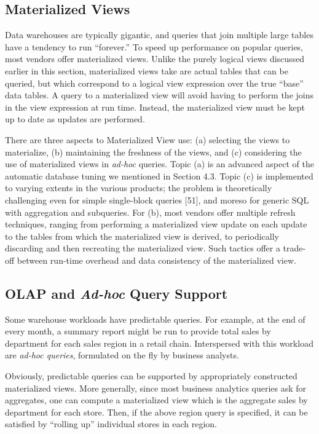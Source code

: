 \documentclass[b5paper,11pt,twoside,openright]{book}
\begin{document}
\hypertarget{materialized-views}{%
\subsection{Materialized Views}\label{materialized-views}}

Data warehouses are typically gigantic, and queries that join multiple
large tables have a tendency to run ``forever.'' To speed up performance
on popular queries, most vendors offer materialized views. Unlike the
purely logical views discussed earlier in this section, materialized
views take are actual tables that can be queried, but which correspond
to a logical view expression over the true ``base'' data tables. A query
to a materialized view will avoid having to perform the joins in the
view expression at run time. Instead, the materialized view must be kept
up to date as updates are performed.

There are three aspects to Materialized View use: (a) selecting the
views to materialize, (b) maintaining the freshness of the views, and
(c) considering the use of materialized views in \emph{ad-hoc} queries.
Topic (a) is an advanced aspect of the automatic database tuning we
mentioned in Section 4.3. Topic (c) is implemented to varying extents in
the various products; the problem is theoretically challenging even for
simple single-block queries {[}51{]}, and moreso for generic SQL with
aggregation and subqueries. For (b), most vendors offer multiple refresh
techniques, ranging from performing a materialized view update on each
update to the tables from which the materialized view is derived, to
periodically discarding and then recreating the materialized view. Such
tactics offer a trade-off between run-time overhead and data consistency
of the materialized view.

\hypertarget{olap-and-ad-hoc-query-support}{%
\subsection{\texorpdfstring{OLAP and \emph{Ad-hoc} Query
Support}{OLAP and Ad-hoc Query Support}}\label{olap-and-ad-hoc-query-support}}

Some warehouse workloads have predictable queries. For example, at the
end of every month, a summary report might be run to provide total sales
by department for each sales region in a retail chain. Interspersed with
this workload are \emph{ad-hoc queries}, formulated on the fly by
business analysts.

Obviously, predictable queries can be supported by appropriately
constructed materialized views. More generally, since most business
analytics queries ask for aggregates, one can compute a materialized
view which is the aggregate sales by department for each store. Then, if
the above region query is specified, it can be satisfied by ``rolling
up'' individual stores in each region.
\end{document}
